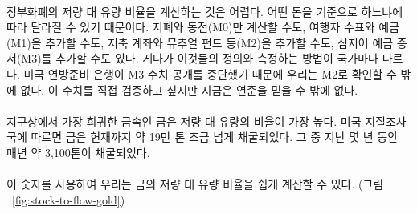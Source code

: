 \paragraph{}
\begin{comment}	
	Calculating the stock-to-flow ratio for fiat currency is difficult, because how
	much money there is depends on how you look at it.~\cite{wiki:money-supply} You
	could count only banknotes and coins (M0), add traveler checks and check
	deposits (M1), add saving accounts and mutual funds and some other things (M2),
	and even add certificates of deposit to all of that (M3). Further, how all of
	this is defined and measured varies from country to country and since the US
	Federal Reserve stopped publishing \cite{web:fed-m3} numbers for M3, we will
	have to make do with the M2 monetary supply. I would love to verify these
	numbers, but I guess we have to trust the fed for now.
\end{comment}
정부화폐의 저량 대 유량 비율을 계산하는 것은 어렵다. 
어떤 돈을 기준으로 하느냐에 따라 달라질 수 있기 때문이다\cite{wiki:money-supply}.
지폐와 동전(M0)만 계산할 수도, 여행자 수표와 예금(M1)을 추가할 수도, 
저축 계좌와 뮤추얼 펀드 등(M2)을 추가할 수도, 심지어 예금 증서(M3)를 추가할 수도 있다.
게다가 이것들의 정의와 측정하는 방법이 국가마다 다르다.
미국 연방준비 은행이 M3 수치 공개를 중단했기 때문에 우리는 M2로 확인할 수 밖에 없다.\cite{web:fed-m3}
이 수치를 직접 검증하고 싶지만 지금은 연준을 믿을 수 밖에 없다.

\paragraph{}
\begin{comment}	
	Gold, one of the rarest metals on earth, has the highest stock-to-flow
	ratio. According to the US Geological Survey, a little more than 190,000
	tons have been mined. In the last few years, around 3100 tons of gold
	have been mined per year.~\cite{mineral-commodity-summaries}
\end{comment}
지구상에서 가장 희귀한 금속인 금은 저량 대 유량의 비율이 가장 높다.
미국 지질조사국에 따르면 금은 현재까지 약 19만 톤 조금 넘게 채굴되었다.
그 중 지난 몇 년 동안 매년 약 3,100톤이 채굴되었다.~\cite{mineral-commodity-summaries}

\paragraph{}
\begin{comment}	
	Using these numbers, we can easily calculate the stock-to-flow ratio for
	gold (see Figure~\ref{fig:stock-to-flow-gold}).
\end{comment}
이 숫자를 사용하여 우리는 금의 저량 대 유량 비율을 쉽게 계산할 수 있다. (그림 ~\ref{fig:stock-to-flow-gold})

